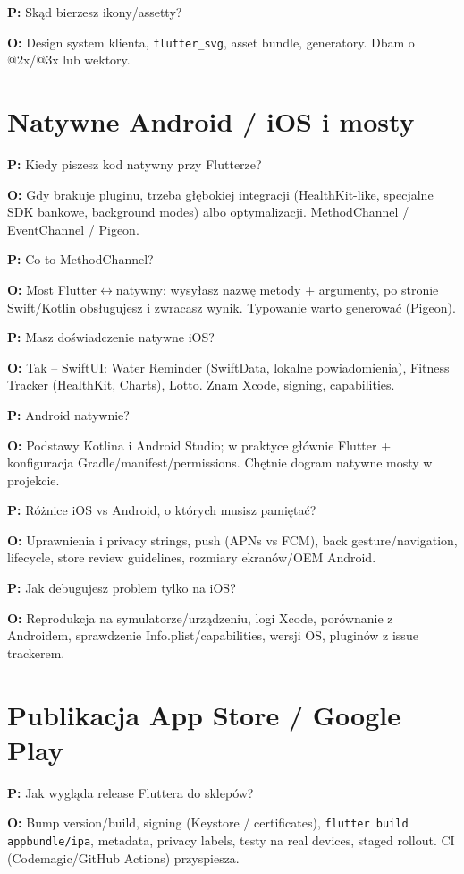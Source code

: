 \documentclass[11pt,a4paper]{article}
\newcommand{\pyt}[1]{\par\medskip\noindent\textbf{P:} #1\par}
\newcommand{\odp}[1]{\noindent\textbf{O:} #1\par}
\begin{document}
\pyt{Skąd bierzesz ikony/assetty?}
\odp{Design system klienta, \texttt{flutter\_svg}, asset bundle, generatory. Dbam o @2x/@3x lub wektory.}

\section{Natywne Android / iOS i mosty}

\pyt{Kiedy piszesz kod natywny przy Flutterze?}
\odp{Gdy brakuje pluginu, trzeba głębokiej integracji (HealthKit-like, specjalne SDK bankowe, background modes) albo optymalizacji. MethodChannel / EventChannel / Pigeon.}

\pyt{Co to MethodChannel?}
\odp{Most Flutter$\leftrightarrow$natywny: wysyłasz nazwę metody + argumenty, po stronie Swift/Kotlin obsługujesz i zwracasz wynik. Typowanie warto generować (Pigeon).}

\pyt{Masz doświadczenie natywne iOS?}
\odp{Tak -- SwiftUI: Water Reminder (SwiftData, lokalne powiadomienia), Fitness Tracker (HealthKit, Charts), Lotto. Znam Xcode, signing, capabilities.}

\pyt{Android natywnie?}
\odp{Podstawy Kotlina i Android Studio; w praktyce głównie Flutter + konfiguracja Gradle/manifest/permissions. Chętnie dogram natywne mosty w projekcie.}

\pyt{Różnice iOS vs Android, o których musisz pamiętać?}
\odp{Uprawnienia i privacy strings, push (APNs vs FCM), back gesture/navigation, lifecycle, store review guidelines, rozmiary ekranów/OEM Android.}

\pyt{Jak debugujesz problem tylko na iOS?}
\odp{Reprodukcja na symulatorze/urządzeniu, logi Xcode, porównanie z Androidem, sprawdzenie Info.plist/capabilities, wersji OS, pluginów z issue trackerem.}

\section{Publikacja App Store / Google Play}

\pyt{Jak wygląda release Fluttera do sklepów?}
\odp{Bump version/build, signing (Keystore / certificates), \texttt{flutter build appbundle/ipa}, metadata, privacy labels, testy na real devices, staged rollout. CI (Codemagic/GitHub Actions) przyspiesza.}
\end{document}
